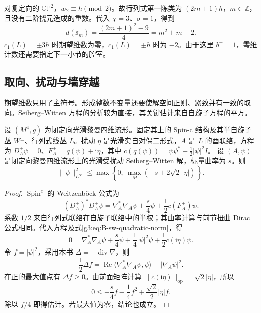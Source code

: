 \begin{example}\label{g3:exm:B-spinc-projective-dimension}
 对复定向的 \(\mathbb{CP}^2\)，\(w_2\equiv h\pmod2\)。故行列式第一陈类为 \((2m+1)h\)，\(m\in\mathbb Z\)，且没有二阶挠元造成的重数。代入 \(\chi=3\)、\(\sigma=1\)，得到
 \[
 d(\mathfrak s_m)=\frac{(2m+1)^2-9}{4}=m^2+m-2.
 \]
 \(c_1(L)=\pm3h\) 时期望维数为零，\(c_1(L)=\pm h\) 时为 \(-2\)。由于这里 \(b^+=1\)，零维计数还需要指定下一小节的腔室。
\end{example}

\subsection{取向、扰动与墙穿越}
\label{g3:subsec:B04:06}

期望维数只用了主符号。形成整数不变量还要使解空间正则、紧致并有一致的取向。Seiberg--Witten 方程的分析较为直接，其关键估计来自自旋子方程的平方。

\begin{proposition}\label{g3:prop:B-sw-czero}
	设 \((M^4,g)\) 为闭定向光滑黎曼四维流形。固定其上的 Spin-c 结构及其半自旋子丛 \(W^\pm\)、行列式线丛 \(L\)。扰动 \(\eta\) 是光滑实自对偶二形式，\(A\) 是 \(L\) 的酉联络，方程为 \(D_A^+\psi=0\)、\(F_A^+=q(\psi)+\mathrm i\eta\)，其中 \(c(q(\psi))=\psi\psi^*-\tfrac12|\psi|^2I\)。
 设 \((A,\psi)\) 是闭定向黎曼四维流形上的光滑受扰动 Seiberg--Witten 解，标量曲率为 \(s\)。则
 \begin{equation}\label{g3:eq:B-sw-czero}
 \|\psi\|_{L^\infty}^2
 \le\max\left\{0,\ \max_M(-s+2\sqrt2\,|\eta|)\right\}.
 \end{equation}
\end{proposition}
\begin{proof}
 \(\operatorname{Spin}^c\) 的 Weitzenböck 公式为
 \[
 (D_A^+)^*D_A^+\psi
 =\nabla_A^*\nabla_A\psi+\frac{s}{4}\psi
      +\frac12c(F_A^+)\psi.
 \]
 系数 \(1/2\) 来自行列式联络在自旋子联络中的半权；其曲率计算与前节扭曲 Dirac 公式相同。代入方程及式\eqref{g3:eq:B-sw-quadratic-norm}，得
 \[
 0=\nabla_A^*\nabla_A\psi+\frac{s}{4}\psi
      +\frac14|\psi|^2\psi+\frac12c(\mathrm i\eta)\psi.
 \]
 令 \(f=|\psi|^2\)，采用本书 \(\Delta=-\operatorname{div}\nabla\)，则
 \[
 \frac12\Delta f
 =\operatorname{Re}\langle\nabla_A^*\nabla_A\psi,\psi\rangle
      -|\nabla_A\psi|^2.
 \]
 在正的最大值点有 \(\Delta f\ge0\)。由前面矩阵计算
 \(\|c(\mathrm i\eta)\|_{\mathrm{op}}=\sqrt2|\eta|\)，所以
 \[
 0\le-\frac{s}{4}f-\frac14f^2
      +\frac{\sqrt2}{2}|\eta|f.
 \]
 除以 \(f/4\) 即得估计。若最大值为零，结论也成立。
\end{proof}

